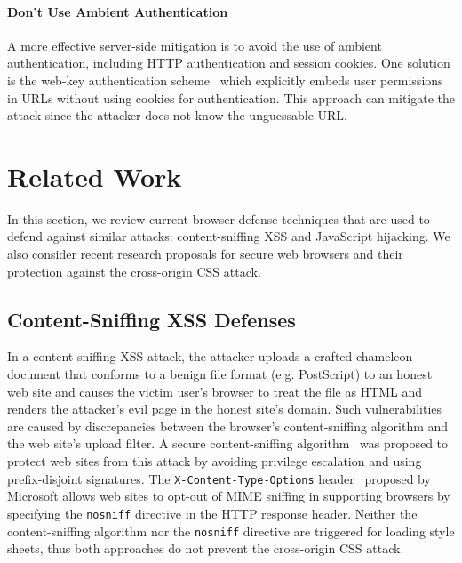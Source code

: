 \documentclass{acm_proc_article-sp}
\begin{document}
\paragraph{Don't Use Ambient Authentication}
A more effective server-side mitigation is to avoid the use of ambient authentication, including HTTP authentication and session cookies. One solution is the web-key authentication scheme~\cite{webkey} which explicitly embeds user permissions in URLs without using cookies for authentication. This approach can mitigate the attack since the attacker does not know the unguessable URL.

\section{Related Work} \label{sec:relatedwork}
In this section, we review current browser defense techniques that are used to
defend against similar attacks: content-sniffing XSS and JavaScript hijacking.
We also consider recent research proposals for secure web browsers and their
protection against the cross-origin CSS attack.

\subsection{Content-Sniffing XSS Defenses}
In a content-sniffing XSS attack, the attacker uploads a crafted chameleon
document that conforms to a benign file format (e.g. PostScript) to an honest
web site and causes the victim user's browser to treat the file as HTML and
renders the attacker's evil page in the honest site's domain. Such
vulnerabilities are caused by discrepancies between the browser's
content-sniffing algorithm and the web site's upload filter. A secure
content-sniffing algorithm~\cite{securecontentsniffing} was proposed to
protect web sites from this attack by avoiding privilege escalation and using
prefix-disjoint signatures. The \texttt{X-Content-Type-Options}
header~\cite{nosniff} proposed by Microsoft allows web sites to opt-out of
MIME sniffing in supporting browsers by specifying the \texttt{nosniff}
directive in the HTTP response header. Neither the content-sniffing algorithm
nor the \texttt{nosniff} directive are triggered for loading style sheets,
thus both approaches do not prevent the cross-origin CSS attack.
\end{document}
